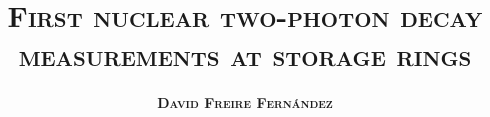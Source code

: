 
\begin{titlepage}
    \author{{\bf \textsc{David Freire Fernández}}}
    \title{\Huge\textbf{\textsc{First nuclear two-photon decay measurements at storage rings}}}
    \maketitle
\end{titlepage}